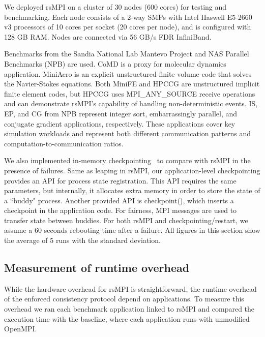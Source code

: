 We deployed rsMPI on a cluster of 30 nodes (600 cores) for testing and benchmarking. Each node consists of a 2-way SMPs with Intel Haswell E5-2660 v3 processors of 10 cores per socket (20 cores per node), and is configured with 128 GB RAM. Nodes are connected via 56 GB/s FDR InfiniBand. %

Benchmarks from the Sandia National Lab Mantevo Project and NAS Parallel Benchmarks (NPB) are used. %
CoMD is a proxy for molecular dynamics application. MiniAero is an explicit unstructured finite volume code that solves the Navier-Stokes equations. Both MiniFE and HPCCG are unstructured implicit finite element codes, but HPCCG uses MPI\_ANY\_SOURCE receive operations and can demonstrate rsMPI's capability of handling non-deterministic events. IS, EP, and CG from NPB represent integer sort, embarrassingly parallel, and conjugate gradient applications, respectively. These applications cover key simulation workloads and represent both different communication patterns and computation-to-communication ratios.

We also implemented in-memory checkpointing~\cite{zheng2004ftc} to compare with rsMPI in the presence of failures. 
Same as leaping in rsMPI, our application-level checkpointing provides an API for process state registration. This API requires the same parameters, but internally, it allocates extra memory in order to store the state of a ``buddy" process. Another provided API is checkpoint(), which inserts a checkpoint in the application code. For fairness, MPI messages are used to transfer state between buddies.  
For both rsMPI and checkpointing/restart, we assume a 60 seconds rebooting time after a failure. All figures in this section show the  average of 5 runs with the standard deviation.

\subsection{Measurement of runtime overhead}
\label{sec:runtime_overhead}
While the hardware overhead for rsMPI is straightforward, 
the runtime overhead of the enforced consistency protocol depend on applications. To measure this overhead we ran each benchmark application linked to rsMPI and compared the execution time with the baseline, where each application runs with unmodified OpenMPI.

